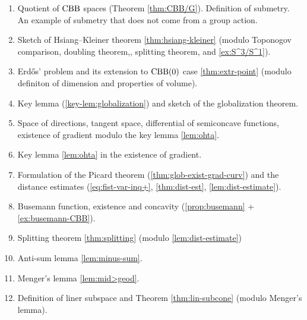 \begin{enumerate}
\item Quotient of $\mathrm{CBB}{}$ spaces (Theorem \ref{thm:CBB/G}). Definition of submetry. An example of submetry that does not come from a group action.
\item Sketch of Hsiang--Kleiner theorem \ref{thm:hsiang-kleiner} (modulo Toponogov comparison, doubling theorem,, splitting theorem, and \ref{ex:S^3/S^1}).
\item Erd\H{o}s' problem and its extension to $\mathrm{CBB}(0)$ case \ref{thm:extr-point} (modulo definiton of dimension and properties of volume).
\item Key lemma (\ref{key-lem:globalization}) and sketch of the globalization theorem.
\item Space of directions, tangent space, differential of semiconcave functions, existence of gradient modulo the key lemma \ref{lem:ohta}.
\item Key lemma \ref{lem:ohta} in the existence of gradient.
\item Formulation of the Picard theorem (\ref{thm:glob-exist-grad-curv}) and the distance estimates (\ref{eq:fist-var-inq+}, \ref{thm:dist-est}, \ref{lem:dist-estimate}).
\item Busemann function, existence and concavity (\ref{prop:busemann} + \ref{ex:busemann-CBB}).
\item Splitting theorem \ref{thm:splitting} (modulo \ref{lem:dist-estimate})
\item Anti-sum lemma \ref{lem:minus-sum}.
\item Menger's lemma \ref{lem:mid>geod}.
\item Definition of liner subspace and Theorem \ref{thm:lin-subcone} (modulo Menger's lemma).
\end{enumerate}

